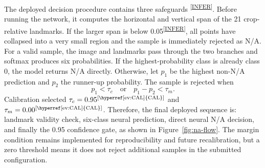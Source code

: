 \documentclass[10pt,twocolumn,a4paper]{article}
\newcommand{\evidence}[1]{\textsuperscript{\scriptsize[\hyperref[ev:#1]{#1}]}}
\newcommand{\result}[2]{#1\evidence{#2}}
\begin{document}
The deployed decision procedure contains three safeguards
\evidence{INFER}. Before running the network, it computes the horizontal and
vertical span of the 21 crop-relative landmarks. If the larger span is below
\result{0.05}{INFER}, all points have collapsed into a very small region and
the sample is immediately rejected as N/A. For a valid sample, the image and
landmarks pass through the two branches and softmax produces six
probabilities. If the highest-probability class is already class 0, the model
returns N/A directly. Otherwise, let $p_1$ be the highest non-N/A prediction
and $p_2$ the runner-up probability. The sample is rejected when
\begin{equation}
p_1 < \tau_c \quad \text{or} \quad p_1-p_2 < \tau_m .
\end{equation}
Calibration selected $\tau_c=\result{0.95}{CAL}$ and
$\tau_m=\result{0.00}{CAL}$. Therefore, the final deployed sequence is:
landmark validity check, six-class neural prediction, direct neural N/A
decision, and finally the 0.95 confidence gate, as shown in
Figure~\ref{fig:na-flow}. The margin condition remains
implemented for reproducibility and future recalibration, but a zero threshold
means it does not reject additional samples in the submitted configuration.
\end{document}
